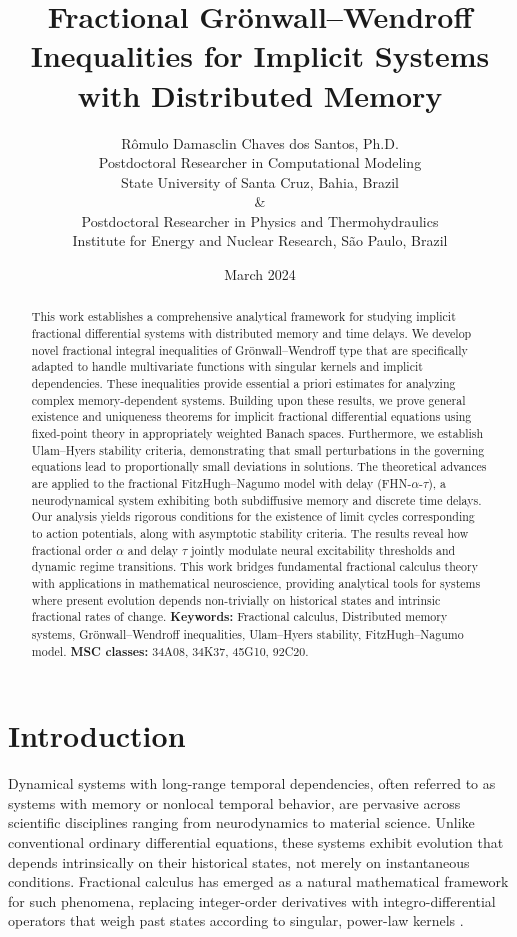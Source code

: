 \documentclass[12pt,a4paper]{article}
\title{\textbf{Fractional Grönwall--Wendroff Inequalities for Implicit Systems with Distributed Memory}}
\author{
	Rômulo Damasclin Chaves dos Santos, Ph.D. \vspace{5pt}\\
	Postdoctoral Researcher in Computational Modeling\\
	State University of Santa Cruz, Bahia, Brazil\\ \& \\
	Postdoctoral Researcher in Physics and Thermohydraulics\\
	Institute for Energy and Nuclear Research, São Paulo, Brazil
}
\date{March 2024}
\numberwithin{equation}{section}
\begin{document}
	
	\maketitle

	
	\begin{abstract}
		This work establishes a comprehensive analytical framework for studying implicit fractional differential systems with distributed memory and time delays. We develop novel fractional integral inequalities of Grönwall--Wendroff type that are specifically adapted to handle multivariate functions with singular kernels and implicit dependencies. These inequalities provide essential a priori estimates for analyzing complex memory-dependent systems. Building upon these results, we prove general existence and uniqueness theorems for implicit fractional differential equations using fixed-point theory in appropriately weighted Banach spaces. Furthermore, we establish Ulam--Hyers stability criteria, demonstrating that small perturbations in the governing equations lead to proportionally small deviations in solutions. The theoretical advances are applied to the fractional FitzHugh--Nagumo model with delay (FHN-$\alpha$-$\tau$), a neurodynamical system exhibiting both subdiffusive memory and discrete time delays. Our analysis yields rigorous conditions for the existence of limit cycles corresponding to action potentials, along with asymptotic stability criteria. The results reveal how fractional order $\alpha$ and delay $\tau$ jointly modulate neural excitability thresholds and dynamic regime transitions. This work bridges fundamental fractional calculus theory with applications in mathematical neuroscience, providing analytical tools for systems where present evolution depends non-trivially on historical states and intrinsic fractional rates of change.
		\newline
		\newline
		\textbf{Keywords:} Fractional calculus, Distributed memory systems, Grönwall–Wendroff inequalities, Ulam–Hyers stability, FitzHugh–Nagumo model.
		\newline
		\newline
		\textbf{MSC classes:} 34A08, 34K37, 45G10, 92C20.
	\end{abstract}
	
	\section{Introduction}
	Dynamical systems with long-range temporal dependencies, often referred to as systems with memory or nonlocal temporal behavior, are pervasive across scientific disciplines ranging from neurodynamics to material science. Unlike conventional ordinary differential equations, these systems exhibit evolution that depends intrinsically on their historical states, not merely on instantaneous conditions. Fractional calculus has emerged as a natural mathematical framework for such phenomena, replacing integer-order derivatives with integro-differential operators that weigh past states according to singular, power-law kernels \cite{podlubny1998,tarasov2011}. 
	
\end{document}
